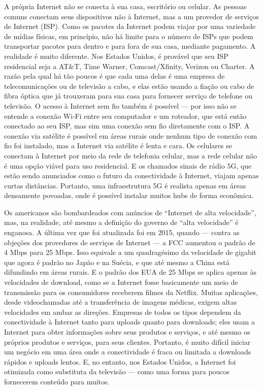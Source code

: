 A própria Internet não se conecta à sua casa, escritório ou celular. As pessoas comuns
conectam seus dispositivos não à Internet, mas a um provedor de serviços de Internet (ISP).
Como os pacotes da Internet podem viajar por uma variedade de mídias físicas, em princípio,
não há limite para o número de ISPs que podem transportar pacotes para dentro e para fora de
sua casa, mediante pagamento. A realidade é muito diferente. Nos Estados Unidos, é provável
que seu ISP residencial seja a AT\&T, Time Warner, Comcast/Xfinity, Verizon ou Charter. A
razão pela qual há tão poucos é que cada uma delas é uma empresa de telecomunicações ou de
televisão a cabo, e elas estão usando a fiação ou cabo de fibra óptica que já trouxeram para
sua casa para fornecer serviço de telefone ou televisão. O acesso à Internet sem fio também é
possível --- por isso não se entende a conexão Wi-Fi entre seu computador e um roteador, que
está então conectado ao seu ISP, mas sim uma conexão sem fio diretamente com o ISP. A conexão
via satélite é possível em áreas rurais onde nenhum tipo de conexão com fio foi instalado,
mas a Internet via satélite é lenta e cara. Os celulares se conectam à Internet por meio da
rede de telefonia celular, mas a rede celular não é uma opção viável para uso residencial. E
os chamados sinais de rádio 5G, que estão sendo anunciados como o futuro da conectividade à
Internet, viajam apenas curtas distâncias. Portanto, uma infraestrutura 5G é realista apenas
em áreas densamente povoadas, onde é possível instalar muitos hubs de forma econômica.

Os americanos são bombardeados com anúncios de ``Internet de alta velocidade'', mas, na
realidade, até mesmo a definição do governo de ``alta velocidade'' é enganosa. A última vez
que foi atualizada foi em 2015, quando --- contra as objeções dos provedores de serviços de
Internet --- a FCC aumentou o padrão de 4 Mbps para 25 Mbps. Isso equivale a um quadragésimo
da velocidade de gigabit que agora é padrão no Japão e na Suécia, e que até mesmo a China
está difundindo em áreas rurais. E o padrão dos EUA de 25 Mbps se aplica apenas às velocidades
de download, como se a Internet fosse basicamente um meio de transmissão para os consumidores
receberem filmes da Netflix. Muitas aplicações, desde videochamadas até a transferência de
imagens médicas, exigem altas velocidades em ambas as direções. Empresas de todos os tipos
dependem da conectividade à Internet tanto para uploads quanto para downloads; eles usam a
Internet para obter informações sobre seus produtos e serviços, e até mesmo os próprios
produtos e serviços, para seus clientes. Portanto, é muito difícil iniciar um negócio em uma
área onde a conectividade é fraca ou limitada a downloads rápidos e uploads lentos. E, no
entanto, nos Estados Unidos, a Internet foi otimizada como substituta da televisão --- como
uma forma para poucos fornecerem conteúdo para muitos.

